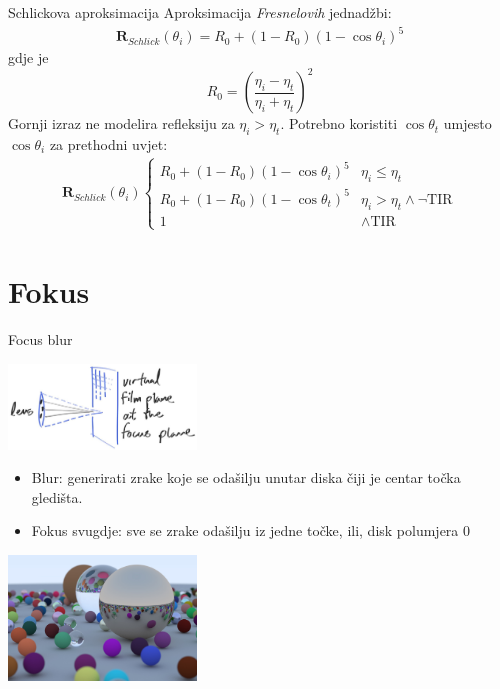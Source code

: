 \documentclass[9pt]{beamer}
\begin{document}
\begin{frame}{Schlickova aproksimacija}
	Aproksimacija \textit{Fresnelovih} jednadžbi:
	\begin{align*}
	\mathbf{R}_{Schlick}(\theta_i) = R_0 + (1-R_0)(1-\cos \theta_i)^5
	\end{align*}
	gdje je 
	$$
	R_0 = \left(\frac{\eta_i-\eta_t}{\eta_i+\eta_t}\right)^2
	$$
	Gornji izraz ne modelira refleksiju za $\eta_i > \eta_t$. Potrebno koristiti $\cos \theta_t$ umjesto $\cos \theta_i$ za prethodni uvjet:
	\begin{align*}
	\mathbf{R}_{Schlick}(\theta_i) \begin{cases}
		R_0 + (1-R_0)(1-\cos \theta_i)^5 & \eta_i\leq\eta_t \\
		R_0 + (1-R_0)(1-\cos \theta_t)^5 & \eta_i > \eta_t \land \neg \mathrm{TIR}\\
		1 & \land \mathrm{TIR}
	\end{cases}      
	\end{align*}
\end{frame}

\section{Fokus}
\begin{frame}{Focus blur}
	\begin{center}
		\includegraphics[width=5cm]{slike/fig-1.18-cam-film-plane.jpg}
	\end{center}
\begin{itemize}
	\item Blur: generirati zrake koje se odašilju unutar diska čiji je centar točka gledišta.
	\item Fokus svugdje: sve se zrake odašilju iz jedne točke, ili, disk polumjera $0$
\end{itemize}

	\begin{center}
		\includegraphics[width=5cm]{slike/img-1.21-book1-final.jpg}
	\end{center}
\end{frame}
\end{document}
